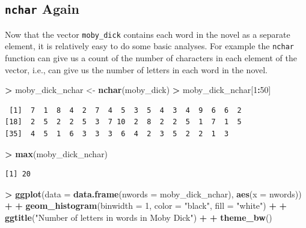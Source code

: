 \documentclass[
]{krantz}
\makeatletter
\newenvironment{Shaded}{\begin{snugshade}}{\end{snugshade}}
\newcommand{\DataTypeTok}[1]{\textcolor[rgb]{0.27,0.27,0.27}{#1}}
\newcommand{\DecValTok}[1]{\textcolor[rgb]{0.06,0.06,0.06}{#1}}
\newcommand{\KeywordTok}[1]{\textcolor[rgb]{0.27,0.27,0.27}{\textbf{#1}}}
\newcommand{\NormalTok}[1]{#1}
\newcommand{\OperatorTok}[1]{\textcolor[rgb]{0.43,0.43,0.43}{\textbf{#1}}}
\newcommand{\StringTok}[1]{\textcolor[rgb]{0.5,0.5,0.5}{#1}}
\newenvironment{kframe}{%
\medskip{}
\setlength{\fboxsep}{.8em}
 \def\at@end@of@kframe{}%
 \ifinner\ifhmode%
  \def\at@end@of@kframe{\end{minipage}}%
  \begin{minipage}{\columnwidth}%
 \fi\fi%
 \def\FrameCommand##1{\hskip\@totalleftmargin \hskip-\fboxsep
 \colorbox{shadecolor}{##1}\hskip-\fboxsep
     \hskip-\linewidth \hskip-\@totalleftmargin \hskip\columnwidth}%
 \MakeFramed {\advance\hsize-\width
   \@totalleftmargin\z@ \linewidth\hsize
   \@setminipage}}%
 {\par\unskip\endMakeFramed%
 \at@end@of@kframe}
\renewenvironment{Shaded}{\begin{kframe}}{\end{kframe}}
\makeatother
\begin{document}
\hypertarget{nchar-again}{%
\subsection{\texorpdfstring{\texttt{nchar} Again}{nchar Again}}\label{nchar-again}}

Now that the vector \texttt{moby\_dick} contains each word in the novel as a separate element, it is relatively easy to do some basic analyses. For example the \texttt{nchar} function can give us a count of the number of characters in each element of the vector, i.e., can give us the number of letters in each word in the novel.

\begin{Shaded}
\begin{Highlighting}[]
\OperatorTok{\textgreater{}}\StringTok{ }\NormalTok{moby\_dick\_nchar \textless{}{-}}\StringTok{ }\KeywordTok{nchar}\NormalTok{(moby\_dick)}
\OperatorTok{\textgreater{}}\StringTok{ }\NormalTok{moby\_dick\_nchar[}\DecValTok{1}\OperatorTok{:}\DecValTok{50}\NormalTok{]}
\end{Highlighting}
\end{Shaded}

\begin{verbatim}
 [1]  7  1  8  4  2  7  4  5  3  5  4  3  4  9  6  6  2
[18]  2  5  2  2  5  3  7 10  2  8  2  2  5  1  7  1  5
[35]  4  5  1  6  3  3  3  6  4  2  3  5  2  2  1  3
\end{verbatim}

\begin{Shaded}
\begin{Highlighting}[]
\OperatorTok{\textgreater{}}\StringTok{ }\KeywordTok{max}\NormalTok{(moby\_dick\_nchar)}
\end{Highlighting}
\end{Shaded}

\begin{verbatim}
[1] 20
\end{verbatim}

\begin{Shaded}
\begin{Highlighting}[]
\OperatorTok{\textgreater{}}\StringTok{ }\KeywordTok{ggplot}\NormalTok{(}\DataTypeTok{data =} \KeywordTok{data.frame}\NormalTok{(}\DataTypeTok{nwords =}\NormalTok{ moby\_dick\_nchar), }\KeywordTok{aes}\NormalTok{(}\DataTypeTok{x =}\NormalTok{ nwords)) }\OperatorTok{+}\StringTok{ }
\OperatorTok{+}\StringTok{   }\KeywordTok{geom\_histogram}\NormalTok{(}\DataTypeTok{binwidth =} \DecValTok{1}\NormalTok{, }\DataTypeTok{color =} \StringTok{"black"}\NormalTok{, }\DataTypeTok{fill =} \StringTok{"white"}\NormalTok{) }\OperatorTok{+}\StringTok{ }
\OperatorTok{+}\StringTok{   }\KeywordTok{ggtitle}\NormalTok{(}\StringTok{"Number of letters in words in Moby Dick"}\NormalTok{) }\OperatorTok{+}\StringTok{ }
\OperatorTok{+}\StringTok{   }\KeywordTok{theme\_bw}\NormalTok{()}
\end{Highlighting}
\end{Shaded}
\end{document}
